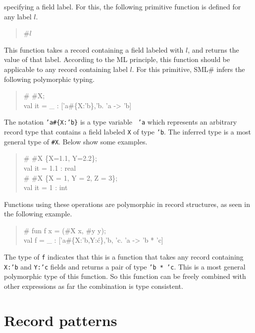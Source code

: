 \documentclass{jbook}
\newcommand{\txt}[2]{#2}
\newcommand{\smlsharp}{SML\#}
\newenvironment{program}{\begin{quote}\begin{tt}}%
                        {\end{tt}\end{quote}}
\begin{document}
specifying a field label.
	For this, the following primitive function is defined for any
label $l$.
\begin{program}
\#$l$
\end{program}
	This function takes a record containing a field labeled with
$l$, and returns the value of that label.
	According to the ML principle, this function should be
applicable to any record containing label $l$.
	For this primitive, \smlsharp{} infers the following
polymorphic typing.
\begin{program}
\# \#X;\\
val it = \_ : ['a\#\{X:'b\},'b. 'a -> 'b]
\end{program}
	The notation {\tt 'a\#\{X:'b\}} is a type variable {\tt
'a} which represents an arbitrary record type that contains a field
labeled {\tt X} of type {\tt 'b}.
	The inferred type is a most general type of {\tt \#X}.
	Below show some examples.
\begin{program}
\# \#X \{X=1.1, Y=2.2\};\\
val it = 1.1 : real\\
\# \#X \{X = 1, Y = 2, Z = 3\};\\
val it = 1 : int
\end{program}
	Functions using these operations are polymorphic in record
structures, as seen in the following example.
\begin{tt}\begin{quote}
\# fun f x = (\#X x, \#y y);\\
val f = \_ : ['a\#\{X:'b,Y:\'c\},'b, 'c. 'a -> 'b * 'c]
\end{quote}\end{tt}
	The type of {\tt f} indicates that this is a function that takes
any record containing {\tt X:'b} and {\tt Y:'c} fields and returns a pair 
of type {\tt 'b * 'c}.
	This is a most general polymorphic type of this function.
	So this function can be freely combined with other expressions
as far the combination is type consistent.
\fi%

\section{\txt{レコードパターン}{Record patterns}}
\label{sec:extensionRecordpattern}
\end{document}
